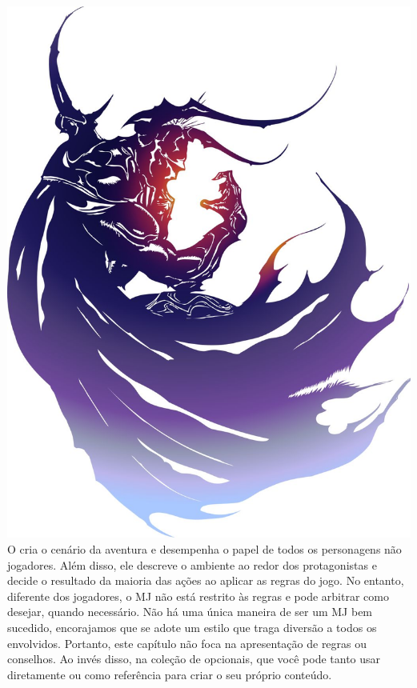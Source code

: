 %
\\\\
%
\includegraphics[width=\columnwidth]{./art/images/ff4.jpg}
%
\vfill
%
O  cria o cenário da aventura e desempenha o papel de todos os personagens não jogadores.
Além disso, ele descreve o ambiente ao redor dos protagonistas e decide o resultado da maioria das ações ao aplicar as regras do jogo.
No entanto, diferente dos jogadores, o MJ não está restrito às regras e pode arbitrar como desejar, quando necessário.
Não há uma única maneira de ser um MJ bem sucedido, encorajamos que se adote um estilo que traga diversão a todos os envolvidos.
%
\vfill
%
Portanto, este capítulo não foca na apresentação de regras ou conselhos.
Ao invés disso, na coleção de  opcionais, que você pode tanto usar diretamente ou como referência para criar o seu próprio conteúdo.

